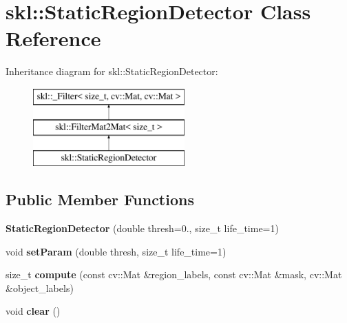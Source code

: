 \hypertarget{classskl_1_1_static_region_detector}{}\section{skl\+:\+:Static\+Region\+Detector Class Reference}
\label{classskl_1_1_static_region_detector}
Inheritance diagram for skl\+:\+:Static\+Region\+Detector\+:\begin{figure}[H]
\begin{center}
\leavevmode
\includegraphics[height=3.000000cm]{classskl_1_1_static_region_detector}
\end{center}
\end{figure}
\subsection*{Public Member Functions}
\begin{DoxyCompactItemize}
\item 
\hypertarget{classskl_1_1_static_region_detector_af9aad28d28e257629fcf3fcb5493f233}{}\label{classskl_1_1_static_region_detector_af9aad28d28e257629fcf3fcb5493f233} 
{\bfseries Static\+Region\+Detector} (double thresh=0., size\+\_\+t life\+\_\+time=1)
\item 
\hypertarget{classskl_1_1_static_region_detector_aa1da9a506f8ba01ca425c2ffe2a86e1f}{}\label{classskl_1_1_static_region_detector_aa1da9a506f8ba01ca425c2ffe2a86e1f} 
void {\bfseries set\+Param} (double thresh, size\+\_\+t life\+\_\+time=1)
\item 
\hypertarget{classskl_1_1_static_region_detector_aadb27183ceabe4245bc8d66cbde3bd09}{}\label{classskl_1_1_static_region_detector_aadb27183ceabe4245bc8d66cbde3bd09} 
size\+\_\+t {\bfseries compute} (const cv\+::\+Mat \&region\+\_\+labels, const cv\+::\+Mat \&mask, cv\+::\+Mat \&object\+\_\+labels)
\item 
\hypertarget{classskl_1_1_static_region_detector_ae7fb3fd041ae662d003a5e51e333743c}{}\label{classskl_1_1_static_region_detector_ae7fb3fd041ae662d003a5e51e333743c} 
void {\bfseries clear} ()
\end{DoxyCompactItemize}
